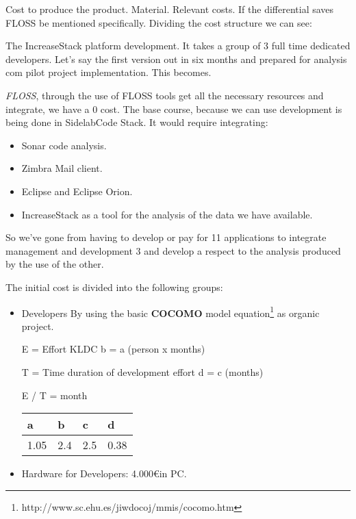 \documentclass[11pt]{scrartcl}
\begin{document}
\par Cost to produce the product. Material. Relevant costs. If the differential saves FLOSS be mentioned specifically. Dividing the cost structure we can see:

\par The IncreaseStack platform development. It takes a group of 3 full time dedicated developers. Let's say the first version out in six months and prepared for analysis com pilot project implementation. This becomes.

\par \emph{FLOSS}, through the use of FLOSS tools get all the necessary resources and integrate, we have a 0 cost. The base course, because we can use development is being done in SidelabCode Stack. It would require integrating:

\begin{itemize}
    \item Sonar code analysis.
    \item Zimbra Mail client.
    \item Eclipse and Eclipse Orion.
    \item IncreaseStack as a tool for the analysis of the data we have available.
\end{itemize}

\par So we've gone from having to develop or pay for 11 applications to integrate management and development 3 and develop a respect to the analysis produced by the use of the other.

\par The initial cost is divided into the following groups:

\begin{itemize}
    \item Developers
     By using the basic \textbf{COCOMO} model equation\footnote{http://www.sc.ehu.es/jiwdocoj/mmis/cocomo.htm}  as organic project.

    E = Effort KLDC b = a (person x months)
    
    T = Time duration of development effort d = c (months)
    
    E / T = month

    \begin{table}[H]
        \centering
        \begin{tabular}{|l|l|l|l|}
            \hline a & b & c & d\\
            \hline 1.05 & 2.4 & 2.5 & 0.38\\
            \hline
        \end{tabular}
    \end{table}

    \item Hardware for Developers: 4.000\euro in PC.
\end{itemize}
\end{document}
